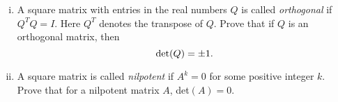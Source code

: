 \begin{question}
	\normalfont 
	\begin{enumerate}[(i)]
	
	\item A square matrix with entries in the real numbers $Q$ is called \emph{orthogonal} if $Q^TQ = I$. Here $Q^T$ denotes the transpose of $Q$. Prove that if $Q$ is an orthogonal matrix, then 
	\[
	\textup{det}(Q) = \pm 1. 
	\]
	
	\item A square matrix is called \emph{nilpotent} if $A^k =0$ for some positive integer $k$. Prove that for a nilpotent matrix $A$, det$(A)=0$. 
	
	
	
	
	\end{enumerate}
	\end{question}
